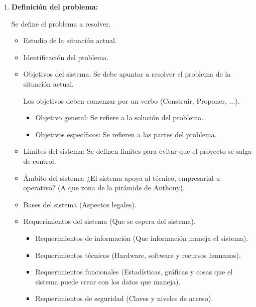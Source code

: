 \documentclass{templateNote}
\begin{document}
\begin{enumerate}
    \item \hypertarget{DF}{\textbf{Definición del problema:}} Se define el problema a resolver.
    \begin{itemize}
        \item Estudio de la situación actual.
        
        \item Identificación del problema.
        
        \item Objetivos del sistema: Se debe apuntar a resolver el problema de la situaci\'on actual.
        
        Los objetivos deben comenzar por un verbo (Construir, Proponer, ...).
        \begin{itemize}
            \item Objetivo general: Se refiere a la soluci\'on del problema.
            
            \item Objetivos espec\'ificos: Se refieren a las partes del problema.
        \end{itemize}
        
        \item Limites del sistema: Se definen limites para evitar que el proyecto se salga de control.
        
        \item Ámbito del sistema: ¿El sistema apoya al t\'ecnico, empresarial u operativo? (A que zona de la pirámide de Anthony).
        
        \item Bases del sistema (Aspectos legales).
        
        \item Requerimientos del sistema (Que se espera del sistema).
        \begin{itemize}
            \item Requerimientos de información (Que información maneja el sistema).
            
            \item Requerimientos técnicos (Hardware, software y recursos humanos).
            
            \item Requerimientos funcionales (Estadísticas, gráficas y cosas que el sistema puede crear con los datos que maneja).
            
            \item Requerimientos de seguridad (Claves y niveles de acceso).
        \end{itemize}
    \end{itemize}


\end{enumerate}
\end{document}
